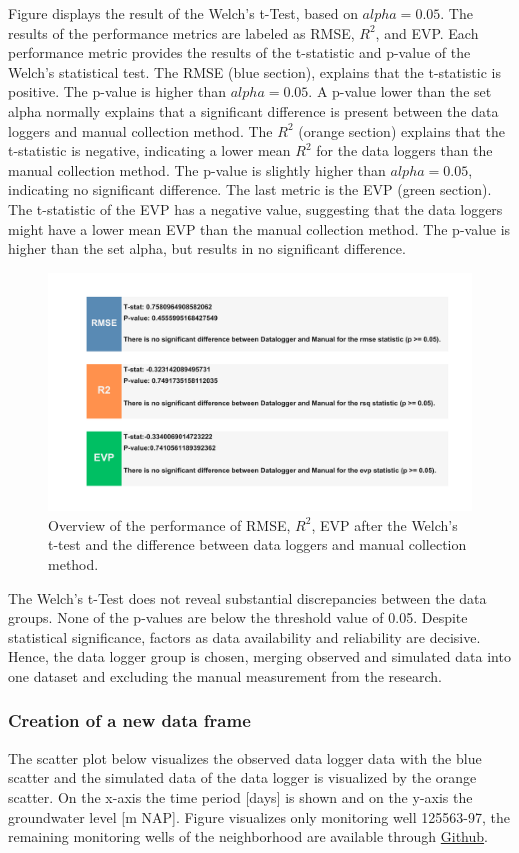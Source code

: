 \noindent
Figure  displays the result of the Welch's t-Test, based on \(alpha = 0.05.\) The results of the performance metrics are labeled as RMSE, $R^2$, and EVP. Each performance metric provides the results of the t-statistic and p-value of the Welch's statistical test. The RMSE (blue section), explains that the t-statistic is positive. The p-value is higher than \(alpha = 0.05\). A p-value lower than the set alpha normally explains that a significant difference is present between the data loggers and manual collection method. The $R^2$ (orange section) explains that the t-statistic is negative, indicating a lower mean $R^2$ for the data loggers than the manual collection method. The p-value is slightly higher than \(alpha = 0.05\), indicating no significant difference. The last metric is the EVP (green section). The t-statistic of the EVP has a negative value, suggesting that the data loggers might have a lower mean EVP than the manual collection method. The p-value is higher than the set alpha, but results in no significant difference. 

\clearpage

\begin{figure}[htbp]
    \centering
    \includegraphics[width=0.80\linewidth]{frontmatter/Heijplaat-fig/statheij.png}
    \caption{Overview of the performance of RMSE, $R^2$, EVP after the Welch's t-test and the difference between data loggers and manual collection method.} 
    \label{welchheij}
\end{figure}
\noindent
The Welch's t-Test does not reveal substantial discrepancies between the data groups. None of the p-values are below the threshold value of 0.05. Despite statistical significance, factors as data availability and reliability are decisive. Hence, the data logger group is chosen, merging observed and simulated data into one dataset and excluding the manual measurement from the research.

\subsubsection{Creation of a new data frame}
The scatter plot  below visualizes the observed data logger data with the blue scatter and the simulated data of the data logger is visualized by the orange scatter. On the x-axis the time period [days] is shown and on the y-axis the groundwater level [m NAP]. Figure  visualizes only monitoring well 125563-97, the remaining monitoring wells of the neighborhood are available through \href{https://github.com/hannahwillemijn9/GWMNO-Rotterdam.git}{Github}.

